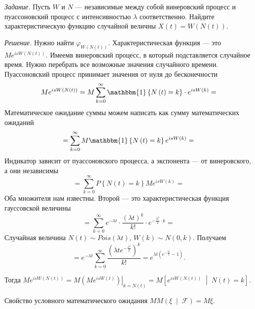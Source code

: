 \textit{Задание.}
Пусть $W$ и $N$ --- независимые между собой винеровский процесс и пуассоновский процесс с
интенсивностью $ \lambda $ соответственно.
Найдите характеристическую функцию случайной величны
$X \left( t \right) = W \left( N \left( t \right) \right) $.

\textit{Решение.}
Нужно найти $ \varphi_{W \left( N \left( t \right) \right) }$.
Характеристическая функция --- это $Me^{isW \left( N \left( t \right) \right) }$.
Имеемв винеровский процесс, в который подставляется случайное время.
Нужно перебрать все возможные значения случайного времени.
Пуассоновский процесс принимает значения от нуля до бесконечности
$$Me^{isW \left( N \left( t \right) \right) } =
  M \sum \limits_{k = 0}^{ \infty }
    \mathbbm{1} \left\{ N \left( t \right) = k \right\} \cdot e^{isW \left( k \right) } =$$
Математическое ожидание суммы можем написать как сумму математических ожиданий
$$= \sum \limits_{k = 0}^{ \infty }
  M \mathbbm{1} \left\{ N \left( t \right) = k \right\} e^{isW \left( k \right) } =$$
Индикатор зависит от пуассоновского процесса, а экспонента --- от винеровского, а они независимы
$$= \sum \limits_{k = 0}^{ \infty }
  P \left\{ N \left( t \right) = k \right\} Me^{isW \left( k \right) } =$$
Оба множителя нам известны.
Второй --- это характеристическая функция гауссовской величины
$$= \sum \limits_{k = 0}^{ \infty } e^{- \lambda t} \cdot
\frac{ \left( \lambda t \right)^k}{k!} \cdot e^{-\frac{ \lambda^2}{2} \cdot k} =$$
Случайная величина
$N \left( t \right) \sim Pois \left( \lambda t \right), \,
  W \left( k \right) \sim N \left( 0, k \right) $.
Получаем
$$= e^{- \lambda t} \sum \limits_{k = 0}^{ \infty } \frac{ \left( \lambda t e^{- \frac{s^2}{2}} \right)^k}{k!} =
  e^{ \lambda t \left( e^{-\frac{s^2}{2}} - 1 \right) }.$$

Тогда
$Me^{isW \left( N \left( t \right) \right) } =
  M \left. \left( Me^{isW \left( t \right) } \right) \right|_{k = N \left( t \right) } =
  M \left[
    e^{isW \left( N \left( t \right) \right) } \; \middle| \; N \left( t \right) = k \right] $.

Свойство условного математического ожидания
$MM \left( \xi \; \middle| \; \mathcal{F} \right) =
  M \xi $.
